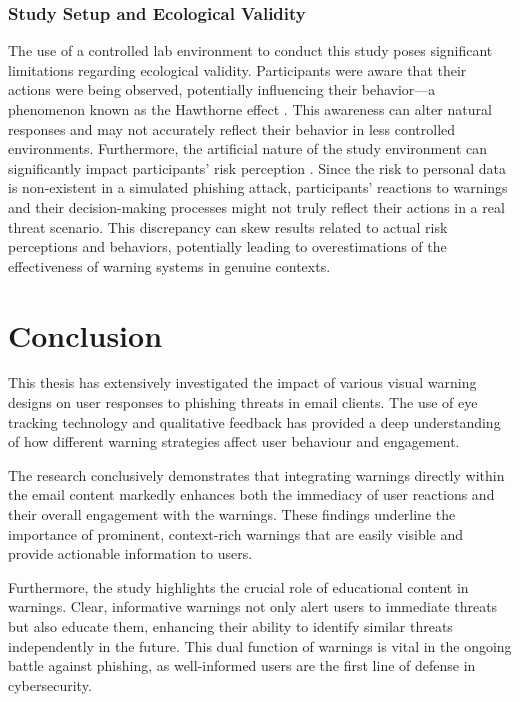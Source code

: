 \documentclass[
  a4paper,  %
  twoside,  %
  bibliography=totoc,
  headsepline,
  cleardoublepage=empty,
  parskip=half,
  draft=false
]{scrbook}
\begin{document}
\subsection{Study Setup and Ecological Validity}
The use of a controlled lab environment to conduct this study poses significant limitations regarding ecological validity. Participants were aware that their actions were being observed, potentially influencing their behavior—a phenomenon known as the Hawthorne effect \cite{jim}. This awareness can alter natural responses and may not accurately reflect their behavior in less controlled environments. \newline
Furthermore, the artificial nature of the study environment can significantly impact participants' risk perception \cite{garfinkel}. Since the risk to personal data is non-existent in a simulated phishing attack, participants' reactions to warnings and their decision-making processes might not truly reflect their actions in a real threat scenario. This discrepancy can skew results related to actual risk perceptions and behaviors, potentially leading to overestimations of the effectiveness of warning systems in genuine contexts.

\chapter{Conclusion}
\label{sec:conclusion}
This thesis has extensively investigated the impact of various visual warning designs on user responses to phishing threats in email clients. The use of eye tracking technology and qualitative feedback has provided a deep understanding of how different warning strategies affect user behaviour and engagement.

The research conclusively demonstrates that integrating warnings directly within the email content markedly enhances both the immediacy of user reactions and their overall engagement with the warnings. These findings underline the importance of prominent, context-rich warnings that are easily visible and provide actionable information to users.

Furthermore, the study highlights the crucial role of educational content in warnings. Clear, informative warnings not only alert users to immediate threats but also educate them, enhancing their ability to identify similar threats independently in the future. This dual function of warnings is vital in the ongoing battle against phishing, as well-informed users are the first line of defense in cybersecurity.
\end{document}
